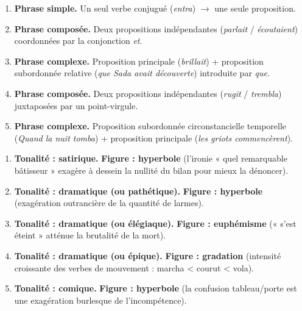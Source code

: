 \documentclass[11pt]{article}
\begin{document}
\begin{corrige}
\begin{enumerate}
\item \textbf{Phrase simple.} Un seul verbe conjugué (\emph{entra}) $\rightarrow$ une seule proposition.
\item \textbf{Phrase composée.} Deux propositions indépendantes (\emph{parlait} / \emph{écoutaient}) coordonnées par la conjonction \emph{et}.
\item \textbf{Phrase complexe.} Proposition principale (\emph{brillait}) + proposition subordonnée relative (\emph{que Sada avait découverte}) introduite par \emph{que}.
\item \textbf{Phrase composée.} Deux propositions indépendantes (\emph{rugit} / \emph{trembla}) juxtaposées par un point-virgule.
\item \textbf{Phrase complexe.} Proposition subordonnée circonstancielle temporelle (\emph{Quand la nuit tomba}) + proposition principale (\emph{les griots commencèrent}).
\end{enumerate}
\end{corrige}

\begin{corrige}
\begin{enumerate}
\item \textbf{Tonalité : satirique.} \textbf{Figure : hyperbole} (l'ironie « quel remarquable bâtisseur » exagère à dessein la nullité du bilan pour mieux la dénoncer).
\item \textbf{Tonalité : dramatique (ou pathétique).} \textbf{Figure : hyperbole} (exagération outrancière de la quantité de larmes).
\item \textbf{Tonalité : dramatique (ou élégiaque).} \textbf{Figure : euphémisme} (« s'est éteint » atténue la brutalité de la mort).
\item \textbf{Tonalité : dramatique (ou épique).} \textbf{Figure : gradation} (intensité croissante des verbes de mouvement : marcha < courut < vola).
\item \textbf{Tonalité : comique.} \textbf{Figure : hyperbole} (la confusion tableau/porte est une exagération burlesque de l'incompétence).
\end{enumerate}
\end{corrige}
\end{document}

